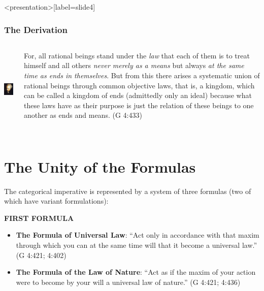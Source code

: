 \begin{frame}<presentation>[label=slide4]
    \frametitle{The Derivation}
        \begin{columns}
            \begin{column}{3cm}
                \includegraphics[height=4cm]{../../../graphics/kant.jpg}
            \end{column}
            \begin{column}{7cm}
                For, all rational beings stand under the \emph{law} that each of them is to treat himself and all others \emph{never merely as a means} but always \emph{at the same time as ends in themselves}. But from this there arises a systematic union of rational beings through common objective laws, that is, a kingdom, which can be called a kingdom of ends (admittedly only an ideal) because what these laws have as their purpose is just the relation of these beings to one another as ends and means. (G 4:433)
            \end{column}
        \end{columns}
\end{frame}

\section{The Unity of the Formulas}

The categorical imperative is represented by a system of three formulas (two of which have variant formulations):

\textbf{FIRST FORMULA}

\begin{itemize}
    \item \textbf{The Formula of Universal Law}: ``Act only in accordance with that maxim through which you can at the same time will that it become a universal law.'' (G 4:421; 4:402)
    \item \textbf{The Formula of the Law of Nature}: ``Act as if the maxim of your action were to become by your will a universal law of nature.'' (G 4:421; 4:436)
\end{itemize}

